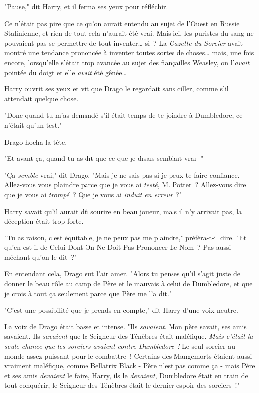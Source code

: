 "Pause," dit Harry, et il ferma ses yeux pour réfléchir.

Ce n'était pas pire que ce qu'on aurait entendu au sujet de l'Ouest en Russie Stalinienne, et rien de tout cela n'aurait été vrai. Mais ici, les puristes du sang ne pouvaient pas se permettre de tout inventer… si~? La \emph{Gazette du Sorcier} avait montré une tendance prononcée à inventer toutes sortes de choses… mais, une fois encore, lorsqu'elle s'était trop avancée au sujet des fiançailles Weasley, on l'\emph{avait} pointée du doigt et elle \emph{avait} été gênée…

Harry ouvrit ses yeux et vit que Drago le regardait sans ciller, comme s'il attendait quelque chose.

"Donc quand tu m'as demandé s'il était temps de te joindre à Dumbledore, ce n'était qu'un test."

Drago hocha la tête.

"Et avant ça, quand tu as dit que ce que je disais semblait vrai -"

"Ça \emph{semble} vrai," dit Drago. "Mais je ne sais pas si je peux te faire confiance. Allez-vous vous plaindre parce que je vous ai \emph{testé}, M. Potter~? Allez-vous dire que je vous ai \emph{trompé}~? Que je vous ai \emph{induit en erreur}~?"

Harry savait qu'il aurait dû sourire en beau joueur, mais il n'y arrivait pas, la déception était trop forte.

"Tu as raison, c'est équitable, je ne peux pas me plaindre," préféra-t-il dire. "Et qu'en est-il de Celui-Dont-On-Ne-Doit-Pas-Prononcer-Le-Nom~? Pas aussi méchant qu'on le dit~?"

En entendant cela, Drago eut l'air amer. "Alors tu penses qu'il s'agit juste de donner le beau rôle au camp de Père et le mauvais à celui de Dumbledore, et que je crois à tout ça seulement parce que Père me l'a dit."

"C'est une possibilité que je prends en compte," dit Harry d'une voix neutre.

La voix de Drago était basse et intense. "Ils \emph{savaient}. Mon père savait, ses amis savaient. Ils \emph{savaient} que le Seigneur des Ténèbres était maléfique. \emph{Mais c'était la seule chance que les sorciers avaient contre Dumbledore~!} Le seul sorcier au monde assez puissant pour le combattre~! Certains des Mangemorts étaient aussi vraiment maléfique, comme Bellatrix Black - Père n'est pas comme ça - mais Père et ses amis \emph{devaient} le faire, Harry, ils le \emph{devaient}, Dumbledore était en train de tout conquérir, le Seigneur des Ténèbres était le dernier espoir des sorciers~!"

